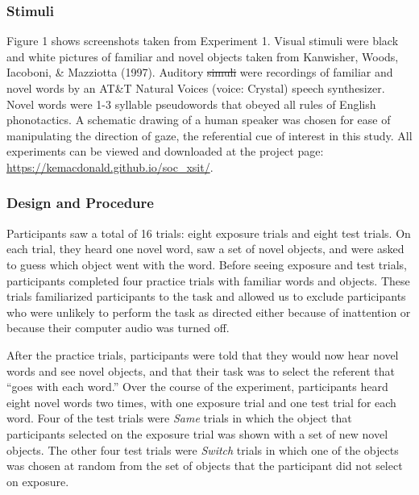 \documentclass[authoryear, review]{elsarticle}
\providecommand{\DIFaddtex}[1]{{\protect\color{blue}\uwave{#1}}} %
\providecommand{\DIFdeltex}[1]{{\protect\color{red}\sout{#1}}}                      %
\providecommand{\DIFaddbegin}{} %
\providecommand{\DIFaddend}{} %
\providecommand{\DIFdelbegin}{} %
\providecommand{\DIFdelend}{} %
\providecommand{\DIFadd}[1]{\texorpdfstring{\DIFaddtex{#1}}{#1}} %
\providecommand{\DIFdel}[1]{\texorpdfstring{\DIFdeltex{#1}}{}} %
\begin{document}
\subsubsection{Stimuli}\label{stimuli}

Figure 1 shows screenshots taken from Experiment 1. Visual stimuli were
black and white pictures of familiar and novel objects taken from
Kanwisher, Woods, Iacoboni, \& Mazziotta (1997). Auditory \DIFdelbegin \DIFdel{simuli }\DIFdelend \DIFaddbegin \DIFadd{stimuli }\DIFaddend were
recordings of familiar and novel words by an AT\&T Natural Voices
\texttrademark (voice: Crystal) speech synthesizer. Novel words were 1-3
syllable pseudowords that obeyed all rules of English phonotactics. A
schematic drawing of a human speaker was chosen for ease of manipulating
the direction of gaze, the referential cue of interest in this study.
All experiments can be viewed and downloaded at the project page:
\url{https://kemacdonald.github.io/soc_xsit/}.

\subsubsection{Design and Procedure}\label{design-and-procedure}

Participants saw a total of 16 trials: eight exposure trials and eight
test trials. On each trial, they heard one novel word, saw a set of
novel objects, and were asked to guess which object went with the word.
Before seeing exposure and test trials, participants completed four
practice trials with familiar words and objects. These trials
familiarized participants to the task and allowed us to exclude
participants who were unlikely to perform the task as directed either
because of inattention or because their computer audio was turned off.

After the practice trials, participants were told that they would now
hear novel words and see novel objects, and that their task was to
select the referent that ``goes with each word.'' Over the course of the
experiment, participants heard eight novel words two times, with one
exposure trial and one test trial for each word. Four of the test trials
were \emph{Same} trials in which the object that participants selected
on the exposure trial was shown with a set of new novel objects. The
other four test trials were \emph{Switch} trials in which one of the
objects was chosen at random from the set of objects that the
participant did not select on exposure.
\end{document}
